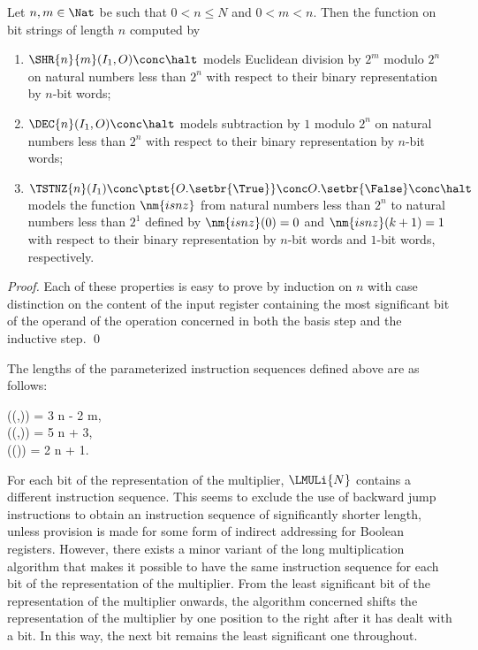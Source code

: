 \documentclass{llncs}
\begin{document}
\begin{proposition}
\label{prop-add-basic-operations-correct}
Let $n,m \in \Nat$ be such that $0 < n \leq N$ and $0 < m < n$.
Then the function on bit strings of length $n$ computed by 
\begin{enumerate}
\item
$\SHR{n}{m}(I_1,O) \conc \halt$ models Euclidean division by $2^m$ 
modulo $2^n$ on natural numbers less than $2^n$ with respect to their 
binary representation by $n$-bit words;
\item
$\DEC{n}(I_1,O) \conc \halt$ models subtraction by $1$ modulo $2^n$ on 
natural numbers less than $2^n$ with respect to their binary 
representation by $n$-bit words;
\item
$\TSTNZ{n}(I_1) \conc
 \ptst{O.\setbr{\True}} \conc O.\setbr{\False} \conc \halt$ 
models the function $\nm{isnz}$ from natural num\-bers less than $2^n$ 
to natural numbers less than $2^1$ defined by $\nm{isnz}(0) = 0$ and 
$\nm{isnz}(k + 1) = 1$ with respect to their binary representation by 
$n$-bit words and $1$-bit words, respectively.
\end{enumerate}
\end{proposition}
\begin{proof}
Each of these properties is easy to prove by induction on $n$ with case 
distinction on the content of the input register containing the most 
significant bit of the operand of the operation concerned in both the 
basis step and the inductive step.
\qed
\end{proof}

The lengths of the parameterized instruction sequences defined above are 
as follows:
\begin{ldispl}
\len((,)) = 3 \mul n - 2 \mul m\;, \\
\len((,)) = 5 \mul n + 3\;, \\
\len(()) = 2 \mul n + 1\;.
\end{ldispl}
For each bit of the representation of the multiplier, $\LMULi{N}$ 
contains a different instruction sequence.
This seems to exclude the use of backward jump instructions to obtain 
an instruction sequence of significantly shorter length, unless 
provision is made for some form of indirect addressing for Boolean 
registers.
However, there exists a minor variant of the long multiplication 
algorithm that makes it possible to have the same instruction sequence 
for each bit of the representation of the multiplier.
From the least significant bit of the representation of the multiplier
onwards, the algorithm concerned shifts the representation of the 
multiplier by one position to the right after it has dealt with a bit.
In this way, the next bit remains the least significant one throughout.
\end{document}

